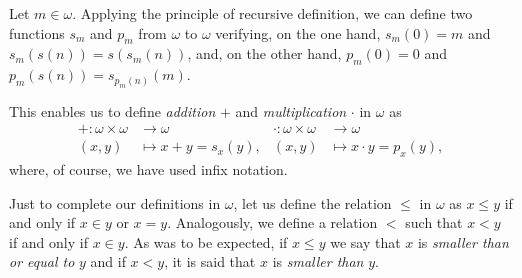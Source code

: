 \begin{definition}
Let $m\in \omega$. Applying the principle of recursive definition, we can define two functions $s_m$ and $p_m$ from $\omega$ to $\omega$ verifying, on the one hand, $s_m(0) = m$ and $s_m(s(n)) = s(s_m(n))$, and, on the other hand, $p_m(0) = 0$ and $p_m(s(n)) = s_{p_m(n)}(m)$.

This enables us to define \emph{addition} $+$ and \emph{multiplication} $\cdot$ in $\omega$ as
\begin{align*}
+:\omega \times \omega & \longrightarrow \omega & \cdot : \omega \times \omega & \longrightarrow \omega \\
(x,y) &\longmapsto x+y = s_x(y), & (x,y) & \longmapsto x\cdot y = p_x(y),
\end{align*}
where, of course, we have used infix notation.

Just to complete our definitions in $\omega$, let us define the relation $\leq$ in $\omega$ as $x\leq y$ if and only if $x\in y$ or $x = y$. Analogously, we define a relation $<$ such that $x < y$ if and only if $x \in y$. As was to be expected, if $x\leq y$ we say that $x$ is \emph{smaller than or equal to} $y$ and if $x < y$, it is said that $x$ is \emph{smaller than} $y$. 
\label{<+label+>}
\end{definition}

